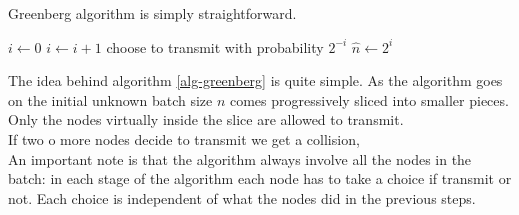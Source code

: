 \documentclass[12pt,a4paper,twocolumns]{report}
\newcommand{\algname}[1]{\ensuremath{\mbox{\sc #1}}}
\begin{document}
Greenberg algorithm is simply straightforward.
\begin{algorithm}[h!]
\begin{algorithmic}
\STATE $i\gets 0$
\REPEAT
	\STATE $i\gets i+1$
	\STATE choose to transmit with probability $2^{-i}$
\STATE $\hat{n} \gets 2^{i}$
\end{algorithmic}
\caption{\algname{Greenberg}}
\label{alg-greenberg}
\end{algorithm}

The idea behind algorithm \ref{alg-greenberg} is quite simple. As the algorithm goes on the initial unknown batch size $n$
comes progressively sliced into smaller pieces. Only the nodes virtually inside the slice are allowed to transmit.\\
If two o more nodes decide to transmit we get a collision,\\
An important note is that the algorithm always involve all the nodes in the batch: in each stage of the algorithm each node has to take a choice if transmit or not. 
Each choice is independent of what the nodes did in the previous steps. 
\end{document}
